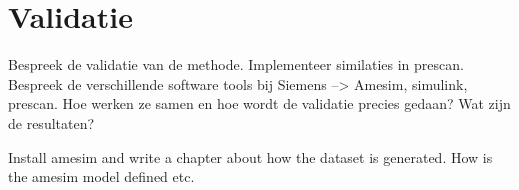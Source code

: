 \chapter{Validatie}
\label{cha:Validation}

Bespreek de validatie van de methode. Implementeer similaties in prescan.
Bespreek de verschillende software tools bij Siemens --> Amesim, simulink, prescan.
Hoe werken ze samen en hoe wordt de validatie precies gedaan? Wat zijn de resultaten?

Install amesim and write a chapter about how the dataset is generated. How is the amesim model defined etc. 



%		




















